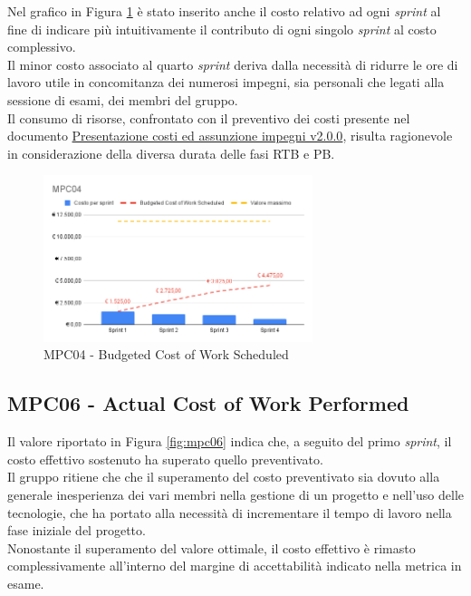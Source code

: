 Nel grafico in Figura \ref{fig:mpc04} è stato inserito anche il costo relativo ad ogni \textit{sprint} al fine di indicare più intuitivamente il contributo di ogni singolo \textit{sprint} al costo complessivo.\\
Il minor costo associato al quarto \textit{sprint} deriva dalla necessità di ridurre le ore di lavoro utile in concomitanza dei numerosi impegni, sia personali che legati alla sessione di esami, dei membri del gruppo.\\
Il consumo di risorse, confrontato con il preventivo dei costi presente nel documento \href{https://project-swenergy.github.io/Candidatura/Presentazione%20costi%20e%20assunzione%20impegni.pdf}{Presentazione costi ed assunzione impegni v2.0.0}, risulta ragionevole in considerazione della diversa durata delle fasi RTB e PB.
\begin{figure}[htbp]
    \centering
    \includegraphics[width=0.7\textwidth]{img/MPC04.png}
    \caption{MPC04 - Budgeted Cost of Work Scheduled}
    \label{fig:mpc04}
\end{figure}

\subsection{MPC06 - Actual Cost of Work Performed}
\label{s:mpc06}
Il valore riportato in Figura \ref{fig:mpc06} indica che, a seguito del primo \textit{sprint}, il costo effettivo sostenuto ha superato quello preventivato.\\
Il gruppo ritiene che che il superamento del costo preventivato sia dovuto alla generale inesperienza dei vari membri nella gestione di un progetto e nell'uso delle tecnologie, che ha portato alla necessità di incrementare il tempo di lavoro nella fase iniziale del progetto.\\
Nonostante il superamento del valore ottimale, il costo effettivo è rimasto complessivamente all'interno del margine di accettabilità indicato nella metrica in esame.

